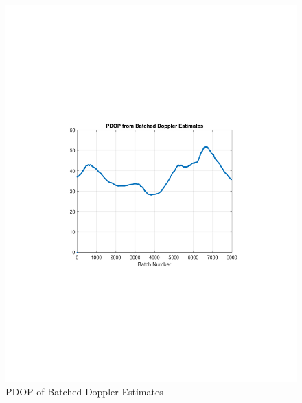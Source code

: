 \documentclass[12pt]{report}
\begin{document}
\begin{figure}[h!]
    \centering
    \includegraphics[trim=1.2in 3.3in 1.75in 3.3in,clip,width=5in]{Irid_Clean_15min_doppler_PDOP.pdf}
    \caption{PDOP of Batched Doppler Estimates}
    \label{fig:PDOPBatchDoppler}
\end{figure}

\pagebreak
\end{document}

